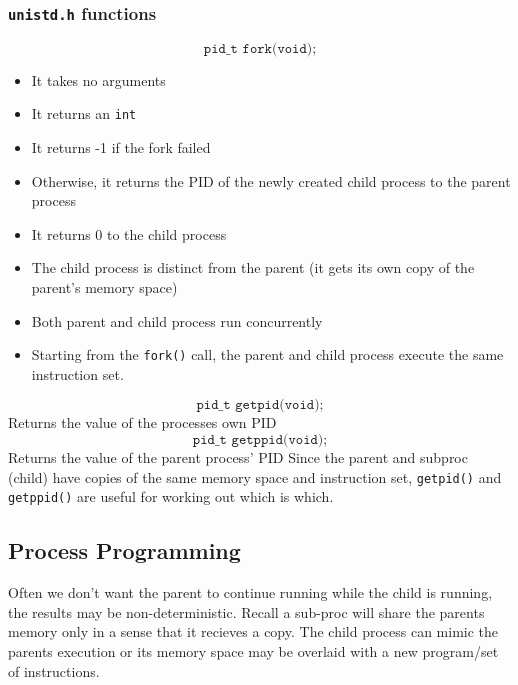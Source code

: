 \documentclass[a4paper, 10pt]{article}
\begin{document}
\subsubsection{\texttt{unistd.h} functions}
$$\boxed{\texttt{pid\_t fork(void);}}$$
\begin{itemize}
    \item It takes no arguments
    \item It returns an \texttt{int}
    \item It returns -1 if the fork failed
    \item Otherwise, it returns the PID of the newly created child process to the parent process
    \item It returns 0 to the child process
    \item The child process is distinct from the parent (it gets its own copy of the parent's memory space)
    \item Both parent and child process run concurrently
    \item Starting from the \texttt{fork()} call, the parent and child process execute the same instruction set.
\end{itemize}
$$\boxed{\texttt{pid\_t getpid(void);}}$$
Returns the value of the processes own PID
$$\boxed{\texttt{pid\_t getppid(void);}}$$
Returns the value of the parent process' PID
Since the parent and subproc (child) have copies of the same memory space and instruction set, \texttt{getpid()}  and \texttt{getppid()} are useful for working out which is which.
\pagebreak
\subsection{Process Programming}
Often we don't want the parent to continue running while the child is running, the results may be non-deterministic. Recall a sub-proc will share the parents memory only in a sense that it recieves a copy. The  child process can mimic the parents execution  or its memory space may be overlaid with a new program/set of instructions. \\[2ex]
\end{document}
